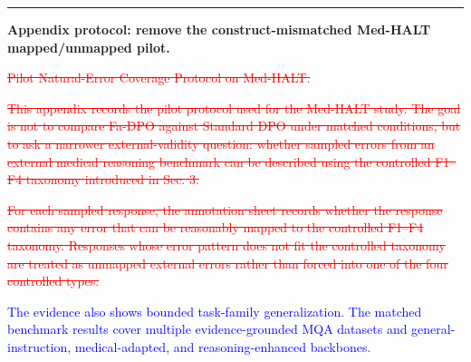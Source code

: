 \documentclass[12pt]{article}
\newcommand{\deleted}[1]{\textcolor{red}{\sout{#1}}}
\newcommand{\added}[1]{\textcolor{blue}{#1}}
\newcommand{\responseheading}[1]{%
    \vspace{0.24cm}
    \par\noindent{\large\bfseries #1}\par
    \vspace{0.03cm}
    \noindent\rule{\linewidth}{0.35pt}\par
    \vspace{0.06cm}
    \noindent\ignorespaces
}
\begin{document}
\responseheading{Revision Details}
\textbf{Appendix protocol: remove the construct-mismatched Med-HALT mapped/unmapped pilot.}
\begin{displayquote}
\deleted{Pilot Natural-Error Coverage Protocol on Med-HALT.}

\deleted{This appendix records the pilot protocol used for the Med-HALT study. The goal is not to compare Fa-DPO against Standard DPO under matched conditions, but to ask a narrower external-validity question: whether sampled errors from an external medical reasoning benchmark can be described using the controlled F1--F4 taxonomy introduced in Sec. 3.}

\deleted{For each sampled response, the annotation sheet records whether the response contains any error that can be reasonably mapped to the controlled F1--F4 taxonomy. Responses whose error pattern does not fit the controlled taxonomy are treated as unmapped external errors rather than forced into one of the four controlled types.}

\added{The evidence also shows bounded task-family generalization. The matched benchmark results cover multiple evidence-grounded MQA datasets and general-instruction, medical-adapted, and reasoning-enhanced backbones.}
\end{displayquote}
\end{document}
